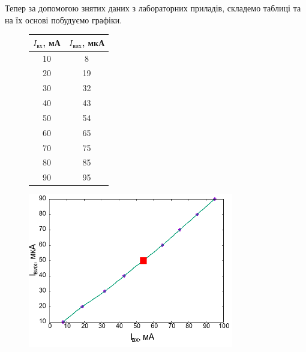 \documentclass[a4paper,14pt]{extreport}
\begin{document}
Тепер за допомогою знятих даних з лабораторних приладів, складемо таблиці та на їх основі побудуємо графіки. 
\begin{figure}[h]
\begin{minipage}{.45\textwidth}
  \centering
  \begin{tabular}{|c|c|}\hline
    $I_{\text{вх}}$, мА & $I_{\text{вих}}$, мкА \\ \hline
    10                & 8                  \\ \hline
    20                & 19                 \\ \hline
    30                & 32                 \\ \hline
    40                & 43                 \\ \hline
    50                & 54                 \\ \hline
    60                & 65                 \\ \hline
    70                & 75                 \\ \hline
    80                & 85                 \\ \hline
    90                & 95                 \\ \hline
    \end{tabular}
\end{minipage}\hfill
\begin{minipage}{.55\textwidth}
  \centering 
  \includegraphics[width=0.8\textwidth]{1.png}
\end{minipage}
\caption{}
\end{figure}
\end{document}
